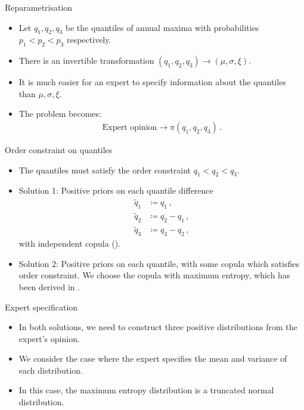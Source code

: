 \documentclass[10pt]{beamer}
\begin{document}
%
\begin{frame}{Reparametrisation}{}
%
\begin{itemize}
	\item Let $q_1, q_2, q_3$ be the quantiles of annual maxima
		with probabilities $p_1 < p_2 < p_3$ respectively.
	\item There is an invertible transformation
		$(q_1, q_2, q_3) \to (\mu, \sigma, \xi)$.
	\item It is much easier for an expert to specify information about
	the quantiles than $\mu, \sigma, \xi$.
	\item The problem becomes:
		\begin{align*}
			\text{Expert opinion} \longrightarrow \pi(q_1, q_2, q_3) \,.
		\end{align*}
\end{itemize}
%
\end{frame}
%
%
\begin{frame}{Order constraint on quantiles}{}
%
\begin{itemize}
	\item The quantiles must satisfy the order constraint
		$q_1 < q_2 < q_3$.
	\item Solution 1: Positive priors on each quantile difference
		\begin{align*}
			\tilde{q}_1 &\coloneqq q_1 \,,\\
			\tilde{q}_2 &\coloneqq q_2 - q_1 \,,\\
			\tilde{q}_3 &\coloneqq q_3 - q_2 \,,
		\end{align*}
		with independent copula (\cite{coles1996}).
	\item Solution 2: Positive priors on each quantile, with some copula
		which satisfies order constraint.
		We choose the copula with maximum entropy,
		which has been derived in \cite{butucea2018}.
\end{itemize}
%
\end{frame}
%
%
\begin{frame}{Expert specification}{}
%

%
\begin{itemize}
	\item In both solutions, we need to construct three positive distributions
		from the expert's opinion.
	\item We consider the case where the expert specifies
		the mean and variance of each distribution.
	\item In this case, the maximum entropy distribution
		is a truncated normal distribution.
\end{itemize}

%
%
\end{frame}
\end{document}
